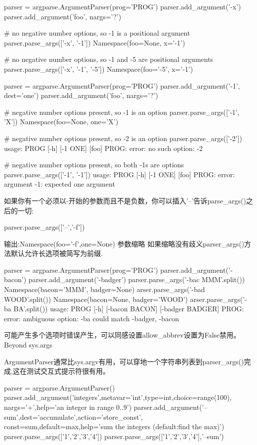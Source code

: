 \begin{python}
parser = argparse.ArgumentParser(prog='PROG')
parser.add_argument('-x')
parser.add_argument('foo', nargs='?')

# no negative number options, so -1 is a positional argument
parser.parse_args(['-x', '-1'])
Namespace(foo=None, x='-1')

# no negative number options, so -1 and -5 are positional arguments
parser.parse_args(['-x', '-1', '-5'])
Namespace(foo='-5', x='-1')

parser = argparse.ArgumentParser(prog='PROG')
parser.add_argument('-1', dest='one')
parser.add_argument('foo', nargs='?')

# negative number options present, so -1 is an option
parser.parse_args(['-1', 'X'])
Namespace(foo=None, one='X')

# negative number options present, so -2 is an option
parser.parse_args(['-2'])
usage: PROG [-h] [-1 ONE] [foo]
PROG: error: no such option: -2

# negative number options present, so both -1s are options
parser.parse_args(['-1', '-1'])
usage: PROG [-h] [-1 ONE] [foo]
PROG: error: argument -1: expected one argument
\end{python}
如果你有一个必须以-开始的参数而且不是负数，你可以插入'--'告诉parse\_args()之后的一切:
\begin{python}
parser.parse_args(['--','-f'])
\end{python}
输出:Namespace(foo='-f',one=None)
参数缩略
如果缩略没有歧义parser\_args()方法默认允许长选项被简写为前缀.
\begin{python}
parser = argparse.ArgumentParser(prog='PROG')
parser.add_argument('-bacon')
parser.add_argument('-badger')
parser.parse_args('-bac MMM'.split())
Namespace(bacon='MMM', badger=None)
arser.parse_args('-bad WOOD'.split())
Namespace(bacon=None, badger='WOOD')
arser.parse_args('-ba BA'.split())
usage: PROG [-h] [-bacon BACON] [-badger BADGER]
PROG: error: ambiguous option: -ba could match -badger, -bacon
\end{python}
可能产生多个选项时错误产生，可以同感设置allow\_abbrev设置为False禁用。
Beyond sys.args\par
ArgumentParser通常比sys.argv有用，可以穿地一个字符串列表到parser\_args()完成,这在测试交互式提示符很有用。
\begin{python}
parser = argparse.ArgumentParser()
parser.add_argument('integers',metavar='int',type=int,choice=range(100),
nargs='+',help='an integer in range 0..9')
parser.add_argument('--sum',dest='accumulate',action='store_const',
const=sum,default=max,help='sum the integers (default:find the max)')
parser.parse_args(['1','2','3','4'])
parser.parse_args(['1','2','3','4'],'--sum')
\end{python}
